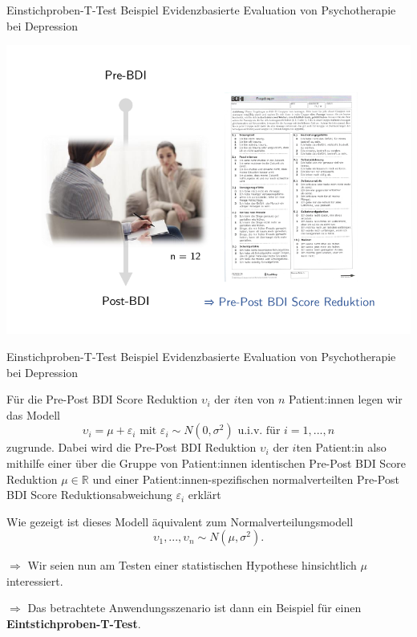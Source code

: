 \documentclass[
  8pt,
  ignorenonframetext,
]{beamer}
\newcommand{\ups} {\upsilon}
\begin{document}
\begin{frame}{Einstichproben-T-Test}
\protect\hypertarget{einstichproben-t-test}{}
Beispiel \textbar{} Evidenzbasierte Evaluation von Psychotherapie bei
Depression

\begin{center}\includegraphics[width=0.8\linewidth]{12_Abbildungen/wtfi_12_messplan} \end{center}
\end{frame}

\begin{frame}{Einstichproben-T-Test}
\protect\hypertarget{einstichproben-t-test-1}{}
Beispiel \textbar{} Evidenzbasierte Evaluation von Psychotherapie bei
Depression \vspace{2mm}

\small

Für die Pre-Post BDI Score Reduktion \(\ups_i\) der \(i\)ten von \(n\)
Patient:innen legen wir das Modell \begin{equation}
\ups_{i} = \mu + \varepsilon_{i} \mbox{ mit } \varepsilon_{i} \sim N(0,\sigma^2) \mbox{ u.i.v. für } i = 1,...,n
\end{equation} zugrunde. Dabei wird die Pre-Post BDI Reduktion
\(\ups_i\) der \(i\)ten Patient:in also mithilfe einer über die Gruppe
von Patient:innen identischen Pre-Post BDI Score Reduktion
\(\mu \in \mathbb{R}\) und einer Patient:innen-spezifischen
normalverteilten Pre-Post BDI Score Reduktionsabweichung
\(\varepsilon_{i}\) erklärt

Wie gezeigt ist dieses Modell äquivalent zum Normalverteilungsmodell
\begin{equation}
\ups_1,...,\ups_n \sim N(\mu,\sigma^2).
\end{equation}

\(\Rightarrow\) Wir seien nun am Testen einer statistischen Hypothese
hinsichtlich \(\mu\) interessiert.

\(\Rightarrow\) Das betrachtete Anwendungsszenario ist dann ein Beispiel
für einen \textbf{Eintstichproben-T-Test}.
\end{frame}
\end{document}
